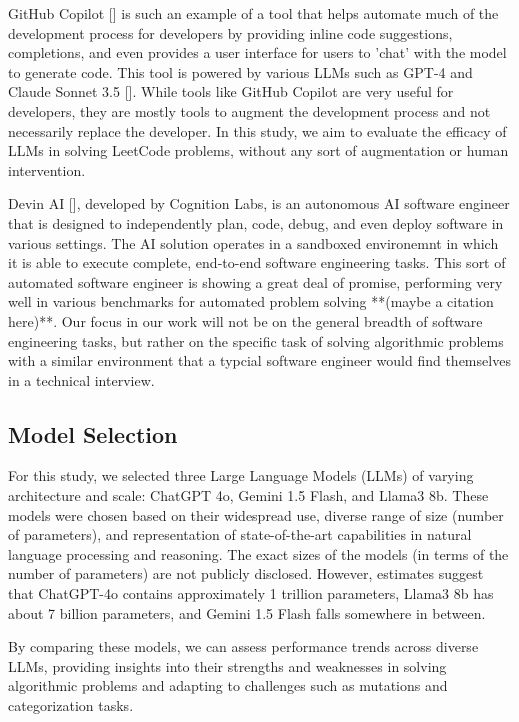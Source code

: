 \documentclass[times, 10pt,twocolumn]{article}
\begin{document}
GitHub Copilot [] is such an example of a tool that helps automate much of the development process for developers by providing inline code suggestions, completions, and even provides a user interface for users to 'chat' with the model to generate code. This tool is powered by various LLMs such as GPT-4 and Claude Sonnet 3.5 []. While tools like GitHub Copilot are very useful for developers, they are mostly tools to augment the development process and not necessarily replace the developer. In this study, we aim to evaluate the efficacy of LLMs in solving LeetCode problems, without any sort of augmentation or human intervention.

Devin AI [], developed by Cognition Labs, is an autonomous AI software engineer that is designed to independently plan, code, debug, and even deploy software in various settings. The AI solution operates in a sandboxed environemnt in which it is able to execute complete, end-to-end software engineering tasks. This sort of automated software engineer is showing a great deal of promise, performing very well in various benchmarks for automated problem solving **(maybe a citation here)**. Our focus in our work will not be on the general breadth of software engineering tasks, but rather on the specific task of solving algorithmic problems with a similar environment that a typcial software engineer would find themselves in a technical interview. 


\subsection{Model Selection}

For this study, we selected three Large Language Models (LLMs) of varying architecture and scale: ChatGPT 4o, Gemini 1.5 Flash, and Llama3 8b. These models were chosen based on their widespread use, diverse range of size (number of parameters), and representation of state-of-the-art capabilities in natural language processing and reasoning. The exact sizes of the models (in terms of the number of parameters) are not publicly disclosed. However, estimates suggest that ChatGPT-4o contains approximately 1 trillion parameters, Llama3 8b has about 7 billion parameters, and Gemini 1.5 Flash falls somewhere in between.

By comparing these models, we can assess performance trends across diverse LLMs, providing insights into their strengths and weaknesses in solving algorithmic problems and adapting to challenges such as mutations and categorization tasks.
\end{document}
